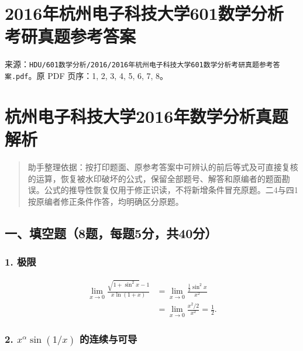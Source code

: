 \documentclass[11pt,fontset=fandol]{ctexart}
\begin{document}
\section{2016年杭州电子科技大学601数学分析考研真题参考答案}\label{ux5e74ux676dux5ddeux7535ux5b50ux79d1ux6280ux5927ux5b66601ux6570ux5b66ux5206ux6790ux8003ux7814ux771fux9898ux53c2ux8003ux7b54ux6848}

来源：\texttt{HDU/601数学分析/2016/2016年杭州电子科技大学601数学分析考研真题参考答案.pdf}。原
PDF 页序：1, 2, 3, 4, 5, 6, 7, 8。

\section{杭州电子科技大学2016年数学分析真题解析}\label{ux676dux5ddeux7535ux5b50ux79d1ux6280ux5927ux5b662016ux5e74ux6570ux5b66ux5206ux6790ux771fux9898ux89e3ux6790}

\begin{quote}
助手整理依据：按打印题面、原参考答案中可辨认的前后等式及可直接复核的运算，恢复被水印破坏的公式，保留全部题号、解答和原编者的题面勘误。公式的推导性恢复仅用于修正识读，不将新增条件冒充原题。二4与四1按原编者修正条件作答，均明确区分原题。
\end{quote}

\subsection{一、填空题（8题，每题5分，共40分）}\label{ux4e00ux586bux7a7aux98988ux9898ux6bcfux98985ux5206ux517140ux5206}

\subsubsection{1. 极限}\label{ux6781ux9650}

\[
\begin{aligned}
\lim_{x\to0}\frac{\sqrt{1+\sin^2x}-1}{x\ln(1+x)}
&=\lim_{x\to0}\frac{\tfrac12\sin^2x}{x^2}\\
&=\lim_{x\to0}\frac{x^2/2}{x^2}=\frac12.
\end{aligned}
\]

\subsubsection{\texorpdfstring{2. \(x^\alpha\sin(1/x)\)
的连续与可导}{2. x\^{}\textbackslash alpha\textbackslash sin(1/x) 的连续与可导}}\label{xalphasin1x-ux7684ux8fdeux7eedux4e0eux53efux5bfc}
\end{document}
